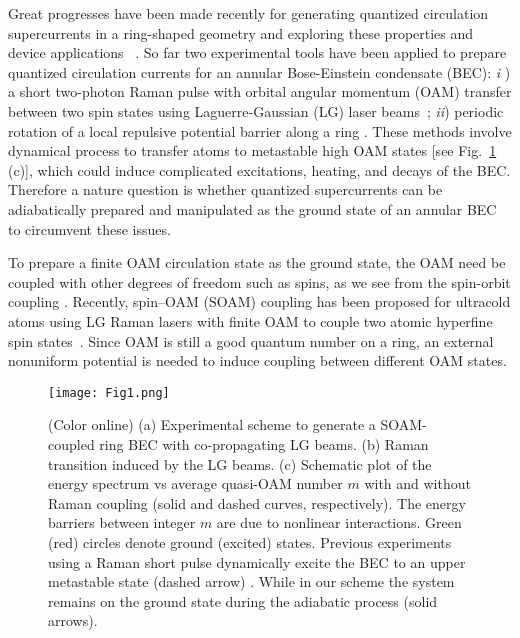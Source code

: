 \documentclass[twocolumn,prl,floatfix,citeautoscript,nofootinbib]{revtex4-1}
\begin{document}
Great progresses have been made recently for generating quantized
circulation supercurrents in a ring-shaped geometry and exploring these
properties and device applications~\cite%
{Ryu2007,Marzlin1997,Cooper2010,Moulder2012,Beattie2013,Ramanathan2011,Wright2013,Jendrzejewski2013,Eckel2014}%
. So far two experimental tools have been applied to prepare quantized
circulation currents for an annular Bose-Einstein condensate (BEC): \textit{i%
}) a short two-photon Raman pulse with orbital angular momentum (OAM)
transfer between two spin states \cite{Ryu2007,Moulder2012,Beattie2013}
using Laguerre-Gaussian (LG) laser beams~\cite{Allen1992}; \textit{ii})
periodic rotation of a local repulsive potential barrier along a ring \cite%
{Ramanathan2011,Wright2013,Jendrzejewski2013,Eckel2014}. These methods
involve dynamical process to transfer atoms to metastable high OAM states
[see Fig.~\ref{fig1} (c)], which could induce complicated excitations,
heating, and decays of the BEC. Therefore a nature question is whether
quantized supercurrents can be adiabatically prepared and manipulated as the
ground state of an annular BEC to circumvent these issues.

To prepare a finite OAM circulation state as the ground state, the OAM need
be coupled with other degrees of freedom such as spins, as we see from the
spin-orbit coupling \cite%
{Lin2011,Zhang2012b,Qu2013a,Olson2014,Hamner2014,Wang2012,Cheuk2012,Williams2013}%
. Recently, spin--OAM (SOAM) coupling has been proposed for ultracold atoms
using LG Raman lasers with finite OAM to couple two atomic hyperfine spin
states~\cite{Sun2015,DeMarco2015,Qu2015}. Since OAM is still a good quantum
number on a ring, an external nonuniform potential is needed to induce
coupling between different OAM states.

\begin{figure}[t]
\centering
\texttt{[image: Fig1.png]}
\caption{(Color online) (a) Experimental scheme to generate a SOAM-coupled
ring BEC with co-propagating LG beams. (b) Raman transition induced by the
LG beams. (c) Schematic plot of the energy spectrum vs average quasi-OAM
number $m$ with and without Raman coupling (solid and dashed curves,
respectively). The energy barriers between integer $m$ are due to nonlinear
interactions. Green (red) circles denote ground (excited) states. Previous
experiments using a Raman short pulse dynamically excite the BEC to an upper
metastable state (dashed arrow) \protect\cite%
{Ryu2007,Moulder2012,Beattie2013}. While in our scheme the system remains on
the ground state during the adiabatic process (solid arrows).}
\label{fig1}
\end{figure}
\end{document}
